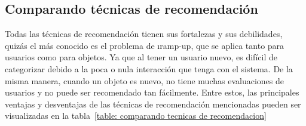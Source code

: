  	\subsection{Comparando técnicas de recomendación}
 		Todas las técnicas de recomendación tienen sus fortalezas y sus debilidades, quizás el más conocido es el problema de \i{ramp-up}, que se aplica tanto para usuarios como para objetos. Ya que al tener un usuario nuevo, es difícil de categorizar debido a la poca o nula interacción que tenga con el sistema. De la misma manera, cuando un objeto es nuevo, no tiene muchas evaluaciones de usuarios y no puede ser recomendado tan fácilmente. Entre estos, las principales ventajas y desventajas de las técnicas de recomendación mencionadas pueden ser visualizadas en la tabla~\ref{table: comparando tecnicas de recomendacion}\cite{5}
 		
